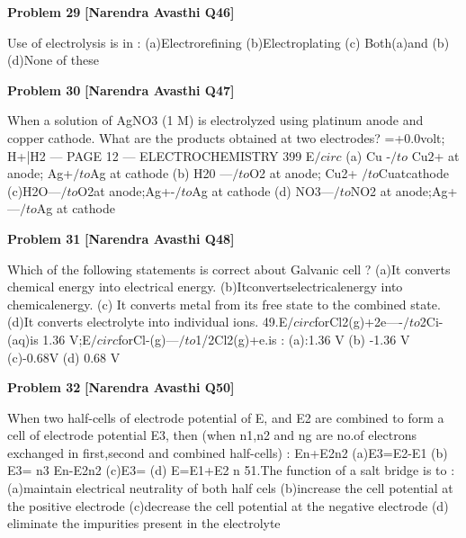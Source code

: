 \begin{problembox}
\textbf{Problem 29} \hfill \textbf{[Narendra Avasthi Q46]}
\label{q:ext-narendra_avasthi_all_questions-29}

Use of electrolysis is in :
(a)Electrorefining
(b)Electroplating
(c) Both(a)and (b)
(d)None of these
\end{problembox}

\begin{problembox}
\textbf{Problem 30} \hfill \textbf{[Narendra Avasthi Q47]}
\label{q:ext-narendra_avasthi_all_questions-30}

When a solution of AgNO3 (1 M) is electrolyzed using platinum anode and copper cathode.
What are the products obtained at two electrodes?
=+0.0volt;
H+|H2
--- PAGE 12 ---
ELECTROCHEMISTRY
399
E$/circ$
(a) Cu -$/to$ Cu$2$+ at anode; Ag+$/to$Ag at cathode
(b) H20 ---$/to$O2 at anode; Cu2+
$/to$Cuatcathode
(c)H2O---$/to$O2at anode;Ag+-$/to$Ag at cathode
(d) NO3---$/to$NO2 at anode;Ag+---$/to$Ag at cathode
\end{problembox}

\begin{problembox}
\textbf{Problem 31} \hfill \textbf{[Narendra Avasthi Q48]}
\label{q:ext-narendra_avasthi_all_questions-31}

Which of the following statements is correct about Galvanic cell ?
(a)It converts chemical energy into electrical energy.
(b)Itconvertselectricalenergy into chemicalenergy.
(c) It converts metal from its free state to the combined state.
(d)It converts electrolyte into individual ions.
49.E$/circ$forCl2(g)+2e----$/to$2Ci-(aq)is 1.36 V;E$/circ$forCl-(g)---$/to$1/2Cl2(g)+e.is :
(a):1.36 V
(b) -1.36 V
(c)-0.68V
(d) 0.68 V
\end{problembox}

\begin{problembox}
\textbf{Problem 32} \hfill \textbf{[Narendra Avasthi Q50]}
\label{q:ext-narendra_avasthi_all_questions-32}

When two half-cells of electrode potential of E, and E2 are combined to form a cell of
electrode potential E3, then
(when n1,n2 and ng are no.of electrons exchanged in first,second and combined half-cells) :
En+E2n2
(a)E3=E2-E1
(b) E3=
n3
En-E2n2
(c)E3=
(d) E=E1+E2
n
51.The function of a salt bridge is to :
(a)maintain electrical neutrality of both half cels
(b)increase the cell potential at the positive electrode
(c)decrease the cell potential at the negative electrode
(d) eliminate the impurities present in the electrolyte
\end{problembox}


